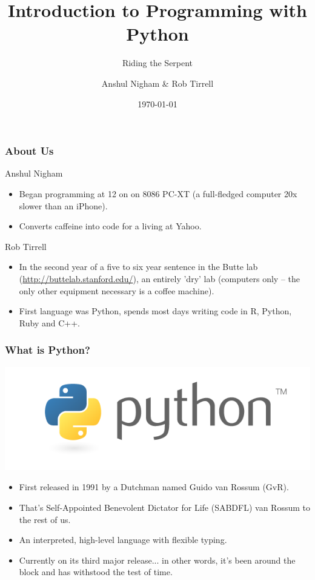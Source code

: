 \documentclass[10pt]{beamer}
\title{Introduction to Programming with Python}
\subtitle{Riding the Serpent}
\author{Anshul Nigham \& Rob Tirrell}
\date{\today}
\begin{document}
\begin{frame}
  \titlepage
\end{frame}

\begin{frame}
  \small
  \frametitle{About Us}
  \begin{block}{Anshul Nigham}
    \begin{itemize}
      \item Began programming at 12 on on 8086 PC-XT (a full-fledged computer 20x slower than an iPhone).
      \item Converts caffeine into code for a living at Yahoo.
    \end{itemize}
  \end{block}
  \begin{block}{Rob Tirrell}
    \begin{itemize}
      \item In the second year of a five to six year sentence in the Butte lab (\href{http://buttelab.stanford.edu/}{http://buttelab.stanford.edu/}), an entirely 'dry' lab (computers only -- the only other equipment necessary is a coffee machine).
      \item First language was Python, spends most days writing code in R, Python, Ruby and C++.
    \end{itemize}
  \end{block}
\end{frame}

\begin{frame}
  \frametitle{What is Python?}
  \centering
  \includegraphics[scale=0.5]{PythonLogo.png} \\
  \begin{itemize}
    \item First released in 1991 by a Dutchman named Guido van Rossum (GvR).
    \item That's Self-Appointed Benevolent Dictator for Life (SABDFL) van Rossum to the rest of us.
    \item An interpreted, high-level language with flexible typing.
    \item Currently on its third major release... in other words, it's been around the block and has withstood the test of time.
  \end{itemize}
\end{frame}
\end{document}
